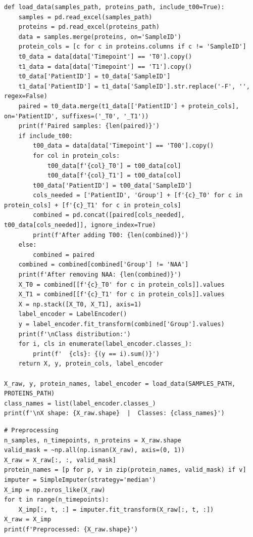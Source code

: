 \begin{lstlisting}
def load_data(samples_path, proteins_path, include_t00=True):
    samples = pd.read_excel(samples_path)
    proteins = pd.read_excel(proteins_path)
    data = samples.merge(proteins, on='SampleID')
    protein_cols = [c for c in proteins.columns if c != 'SampleID']
    t0_data = data[data['Timepoint'] == 'T0'].copy()
    t1_data = data[data['Timepoint'] == 'T1'].copy()
    t0_data['PatientID'] = t0_data['SampleID']
    t1_data['PatientID'] = t1_data['SampleID'].str.replace('-F', '', regex=False)
    paired = t0_data.merge(t1_data[['PatientID'] + protein_cols], on='PatientID', suffixes=('_T0', '_T1'))
    print(f'Paired samples: {len(paired)}')
    if include_t00:
        t00_data = data[data['Timepoint'] == 'T00'].copy()
        for col in protein_cols:
            t00_data[f'{col}_T0'] = t00_data[col]
            t00_data[f'{col}_T1'] = t00_data[col]
        t00_data['PatientID'] = t00_data['SampleID']
        cols_needed = ['PatientID', 'Group'] + [f'{c}_T0' for c in protein_cols] + [f'{c}_T1' for c in protein_cols]
        combined = pd.concat([paired[cols_needed], t00_data[cols_needed]], ignore_index=True)
        print(f'After adding T00: {len(combined)}')
    else:
        combined = paired
    combined = combined[combined['Group'] != 'NAA']
    print(f'After removing NAA: {len(combined)}')
    X_T0 = combined[[f'{c}_T0' for c in protein_cols]].values
    X_T1 = combined[[f'{c}_T1' for c in protein_cols]].values
    X = np.stack([X_T0, X_T1], axis=1)
    label_encoder = LabelEncoder()
    y = label_encoder.fit_transform(combined['Group'].values)
    print(f'\nClass distribution:')
    for i, cls in enumerate(label_encoder.classes_):
        print(f'  {cls}: {(y == i).sum()}')
    return X, y, protein_cols, label_encoder
 
X_raw, y, protein_names, label_encoder = load_data(SAMPLES_PATH, PROTEINS_PATH)
class_names = list(label_encoder.classes_)
print(f'\nX shape: {X_raw.shape}  |  Classes: {class_names}')
\end{lstlisting}
 
\begin{lstlisting}
# Preprocessing
n_samples, n_timepoints, n_proteins = X_raw.shape
valid_mask = ~np.all(np.isnan(X_raw), axis=(0, 1))
X_raw = X_raw[:, :, valid_mask]
protein_names = [p for p, v in zip(protein_names, valid_mask) if v]
imputer = SimpleImputer(strategy='median')
X_imp = np.zeros_like(X_raw)
for t in range(n_timepoints):
    X_imp[:, t, :] = imputer.fit_transform(X_raw[:, t, :])
X_raw = X_imp
print(f'Preprocessed: {X_raw.shape}')
\end{lstlisting}
 
